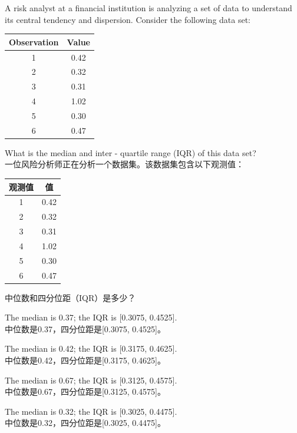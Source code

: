 \documentclass{article}
\newcounter{question} %
\begin{document}
\begin{question}
    A risk analyst at a financial institution is analyzing a set of data to understand its central tendency and dispersion. Consider the following data set:
    \begin{center}
    \begin{tabular}{|c|c|}
    \hline
    Observation & Value \\
    \hline
    1 & 0.42 \\
    \hline
    2 & 0.32 \\
    \hline
    3 & 0.31 \\
    \hline
    4 & 1.02 \\
    \hline
    5 & 0.30 \\
    \hline
    6 & 0.47 \\
    \hline
    \end{tabular}
    \end{center}
    What is the median and inter - quartile range (IQR) of this data set?\\
    一位风险分析师正在分析一个数据集。该数据集包含以下观测值：
    \begin{center}
    \begin{tabular}{|c|c|}
    \hline
    观测值 & 值 \\
    \hline
    1 & 0.42 \\
    \hline
    2 & 0.32 \\
    \hline
    3 & 0.31 \\
    \hline
    4 & 1.02 \\
    \hline
    5 & 0.30 \\
    \hline
    6 & 0.47 \\
    \hline
    \end{tabular}
    \end{center}
    中位数和四分位距（IQR）是多少？
    \end{question}
    
    \begin{choices}
        \item The median is 0.37; the IQR is [0.3075, 0.4525].\\
        中位数是0.37，四分位距是[0.3075, 0.4525]。
        \item The median is 0.42; the IQR is [0.3175, 0.4625].\\
        中位数是0.42，四分位距是[0.3175, 0.4625]。
        \item The median is 0.67; the IQR is [0.3125, 0.4575].\\
        中位数是0.67，四分位距是[0.3125, 0.4575]。
        \item The median is 0.32; the IQR is [0.3025, 0.4475].\\
        中位数是0.32，四分位距是[0.3025, 0.4475]。
    \end{choices}
    
\end{document}

